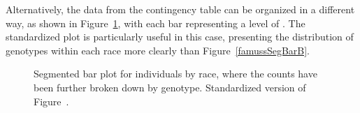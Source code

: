 Alternatively, the data from the contingency table can be organized in a different way, as shown in Figure~\ref{famussSegBarPlotB}, with each bar representing a level of . The standardized plot is particularly useful in this case, presenting the distribution of genotypes within each race more clearly than Figure~\ref{famussSegBarB}.

\begin{figure}[h!]
\centering
{}
\caption{ Segmented bar plot for individuals by race, where the counts have been further broken down by genotype.  Standardized version of Figure~.}
\label{famussSegBarPlotB}
\end{figure}

